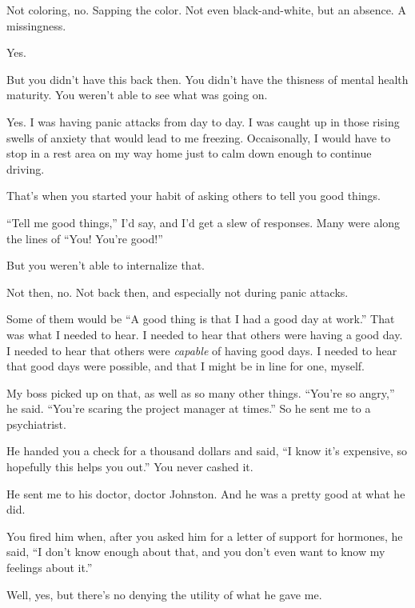 \begin{ally}
Not coloring, no. Sapping the color. Not even black-and-white, but an absence. A missingness.
\end{ally}
Yes.

\begin{ally}
But you didn't have this back then. You didn't have the thisness of mental health maturity. You weren't able to see what was going on.
\end{ally}
Yes. I was having panic attacks from day to day. I was caught up in those rising swells of anxiety that would lead to me freezing. Occaisonally, I would have to stop in a rest area on my way home just to calm down enough to continue driving.

\begin{ally}
That's when you started your habit of asking others to tell you good things.
\end{ally}
``Tell me good things,'' I'd say, and I'd get a slew of responses. Many were along the lines of ``You! You're good!''

\begin{ally}
But you weren't able to internalize that.
\end{ally}
Not then, no. Not back then, and especially not during panic attacks.

Some of them would be ``A good thing is that I had a good day at work.'' That was what I needed to hear. I needed to hear that others were having a good day. I needed to hear that others were \emph{capable} of having good days. I needed to hear that good days were possible, and that I might be in line for one, myself.

My boss picked up on that, as well as so many other things. ``You're so angry,'' he said. ``You're scaring the project manager at times.'' So he sent me to a psychiatrist.

\begin{ally}
He handed you a check for a thousand dollars and said, ``I know it's expensive, so hopefully this helps you out.'' You never cashed it.
\end{ally}
He sent me to his doctor, doctor Johnston. And he was a pretty good at what he did.

\begin{ally}
You fired him when, after you asked him for a letter of support for hormones, he said, ``I don't know enough about that, and you don't even want to know my feelings about it.''
\end{ally}
Well, yes, but there's no denying the utility of what he gave me.

